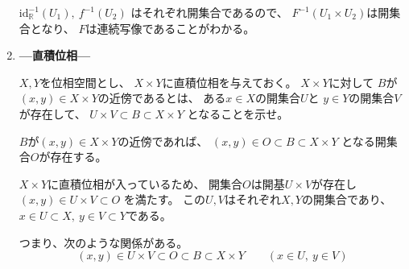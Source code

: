\documentclass[12pt,b5paper]{ltjsarticle}
\begin{document}
\begin{enumerate}
      $\mathrm{id}_{\mathbb{R}}^{-1}(U_1), \ f^{-1}(U_2)$
      はそれぞれ開集合であるので、
      $F^{-1}(U_1\times U_2)$は開集合となり、
      $F$は連続写像であることがわかる。

      \hrulefill

 \item
      \textbf{---直積位相---}

      $X,Y$を位相空間とし、
      $X\times Y$に直積位相を与えておく。
      $X\times Y$に対して
      $B$が$(x,y)\in X\times Y$の近傍であるとは、
      ある$x\in X$の開集合$U$と
      $y\in Y$の開集合$V$が存在して、
      $U\times V \subset B \subset X\times Y$
      となることを示せ。


      \dotfill

      $B$が$(x,y)\in X\times Y$の近傍であれば、
      $(x,y)\in O \subset B \subset X\times Y$
      となる開集合$O$が存在する。

      $X\times Y$に直積位相が入っているため、
      開集合$O$は開基$U\times V$が存在し
      $(x,y)\in U\times V \subset O$
      を満たす。
      この$U,V$はそれぞれ$X,Y$の開集合であり、
      $x\in U \subset X, \ y\in V \subset Y$である。

      つまり、次のような関係がある。
      \begin{equation}
       (x,y)\in U\times V \subset O \subset B \subset X\times Y
        \qquad (x\in U,\ y\in V)
      \end{equation}

      \hrulefill

\end{enumerate}
\end{document}
